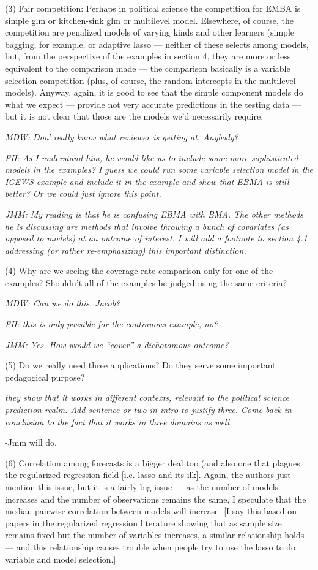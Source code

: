 \documentclass[10pt]{article}
\begin{document}
(3) Fair competition: Perhaps in political science the competition for
EMBA is simple glm or kitchen-sink glm or multilevel model. Elsewhere,
of course, the competition are penalized models of varying kinds and
other learners (simple bagging, for example, or adaptive lasso ---
neither of these selects among models, but, from the perspective of
the examples in section 4, they are more or less equivalent to the
comparison made --- the comparison basically is a variable selection
competition (plus, of course, the random intercepts in the multilevel
models). Anyway, again, it is good to see that the simple component
models do what we expect --- provide not very accurate predictions in
the testing data --- but it is not clear that those are the models
we'd necessarily require.

{\it MDW: Don' really know what reviewer is getting at. Anybody?}

{\it FH: As I understand him, he would like us to include some more sophisticated models in the examples? I guess we could run some variable selection model in the ICEWS example and include it in the example and show that EBMA is still better? Or we could just ignore this point.}

{\it JMM:  My reading is that he is confusing EBMA with BMA.  The other methods he is discussing are methods that involve throwing a bunch of covariates (as opposed to models) at an outcome of interest.  I will add a footnote to section 4.1 addressing (or rather re-emphasizing) this important distinction.}

(4) Why are we seeing the coverage rate comparison only
for one of the examples? Shouldn't all of the examples be judged using
the same criteria?

{\it MDW: Can we do this, Jacob?}

{\it FH: this is only possible for the continuous example, no?}

{\it JMM: Yes.  How would we ``cover'' a dichotomous outcome?}

(5) Do we really need three applications? Do they serve some important
pedagogical purpose? 

{\it they show that it works in different contexts, relevant to the political science prediction realm. Add sentence or two in intro to justify three. Come back in conclusion to the fact that it works in three domains as well.

-Jmm will do.}


(6) Correlation among forecasts is a bigger deal too (and also one
that plagues the regularized regression field [i.e. lasso and its
ilk]. Again, the authors just mention this issue, but it is a fairly
big issue --- as the number of models increases and the number of
observations remains the same, I speculate that the median pairwise
correlation between models will increase. [I say this based on papers
in the regularized regression literature showing that as sample size
remains fixed but the number of variables increases, a similar
relationship holds --- and this relationship causes trouble when
people try to use the lasso to do variable and model selection.]
\end{document}
